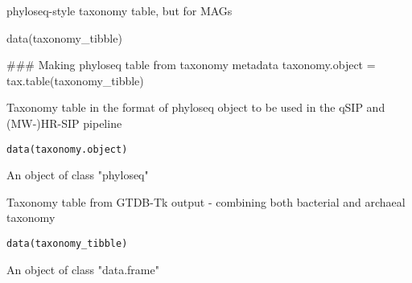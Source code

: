 \documentclass[a4paper]{book}
\begin{document}
%
\begin{Value}
phyloseq-style taxonomy table, but for MAGs
\end{Value}
%
\begin{Examples}
\begin{ExampleCode}
data(taxonomy_tibble)



### Making phyloseq table from taxonomy metadata
taxonomy.object = tax.table(taxonomy_tibble)


\end{ExampleCode}
\end{Examples}
%
\begin{Description}\relax
Taxonomy table in the format of phyloseq object to be used in the qSIP and (MW-)HR-SIP pipeline
\end{Description}
%
\begin{Usage}
\begin{verbatim}
data(taxonomy.object)
\end{verbatim}
\end{Usage}
%
\begin{Format}
An object of class "phyloseq"
\end{Format}
%
\begin{Description}\relax
Taxonomy table from GTDB-Tk output - combining both bacterial and archaeal taxonomy
\end{Description}
%
\begin{Usage}
\begin{verbatim}
data(taxonomy_tibble)
\end{verbatim}
\end{Usage}
%
\begin{Format}
An object of class "data.frame"
\end{Format}
\printindex{}
\end{document}
